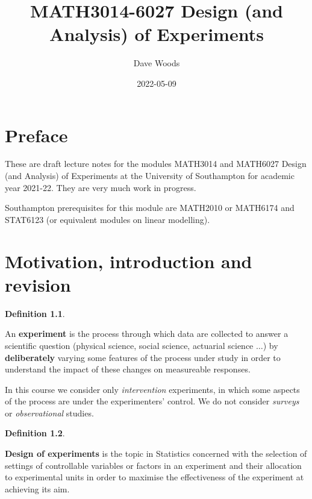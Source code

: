\documentclass[
]{book}
\title{MATH3014-6027 Design (and Analysis) of Experiments}
\author{Dave Woods}
\date{2022-05-09}
\theoremstyle{definition}
\newtheorem{definition}{Definition}[chapter]
\theoremstyle{definition}
\theoremstyle{definition}
\theoremstyle{definition}
\theoremstyle{remark}
\begin{document}
\maketitle

{
\setcounter{tocdepth}{1}
\tableofcontents
}
\hypertarget{preface}{%
\chapter*{Preface}\label{preface}}

These are draft lecture notes for the modules MATH3014 and MATH6027 Design (and Analysis) of Experiments at the University of Southampton for academic year 2021-22. They are very much work in progress.

Southampton prerequisites for this module are MATH2010 or MATH6174 and STAT6123 (or equivalent modules on linear modelling).

\newcommand{\bx}{\boldsymbol{x}}
\newcommand{\btheta}{\boldsymbol{\theta}}
\newcommand{\bbeta}{\boldsymbol{\beta}}
\newcommand{\bvarepsilon}{\boldsymbol{\varepsilon}}
\newcommand{\by}{\boldsymbol{y}}
\newcommand{\rT}{\mathrm{T}}
\newcommand{\Var}{\operatorname{Var}}
\newcommand{\bY}{\boldsymbol{y}}
\newcommand{\btau}{\boldsymbol{\tau}}

\hypertarget{intro}{%
\chapter{Motivation, introduction and revision}\label{intro}}

\begin{definition}
\protect\hypertarget{def:exp}{}\label{def:exp}

An \textbf{experiment} is the process through which data are collected to answer a scientific question (physical science, social science, actuarial science \(\dots\)) by \textbf{deliberately} varying some features of the process under study in order to understand the impact of these changes on measureable responses.

In this course we consider only \emph{intervention} experiments, in which some aspects of the process are under the experimenters' control. We do not consider \emph{surveys} or \emph{observational} studies.

\end{definition}

\begin{definition}
\protect\hypertarget{def:design}{}\label{def:design}

\textbf{Design of experiments} is the topic in Statistics concerned with the selection of settings of controllable variables or factors in an experiment and their allocation to experimental units in order to maximise the effectiveness of the experiment at achieving its aim.

\end{definition}
\end{document}
